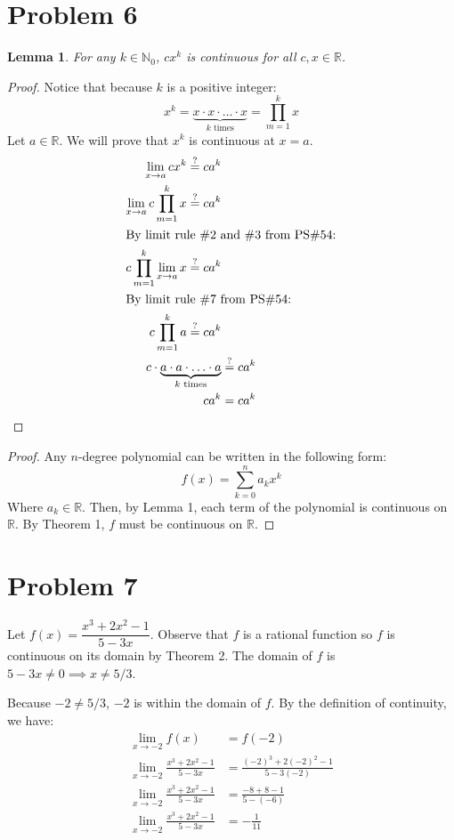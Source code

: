 \documentclass{article}
\newtheorem{lemma}{Lemma}
\newcommand*{\problem}[1]{\section*{Problem #1}}
\newcommand*{\limit}[2][x]{\ensuremath{\displaystyle\lim_{#1\to#2}}}
\begin{document}
\problem{6}
\begin{lemma}
	For any $k\in\mathbb{N}_0$, $cx^k$ is continuous for all $c,x\in\mathbb{R}$.
\end{lemma}
\begin{proof}
	Notice that because $k$ is a positive integer:
	\begin{equation*}
		x^k=\underbrace{x\cdot x\cdot\ldots\cdot x}_{k\text{ times}}=\prod_{m=1}^{k}x
	\end{equation*}
	Let $a\in\mathbb{R}$. We will prove that $x^k$ is continuous at $x=a$.
	\begin{align*}
		\limit{a}cx^k\overset{?}{=}ca^k \\
		\limit{a}c\prod_{m=1}^{k}x\overset{?}{=}ca^k \\
		\intertext{By limit rule \#2 and \#3 from PS\#54:}
		c\prod_{m=1}^{k}\limit{a}x\overset{?}{=}ca^k \\
		\intertext{By limit rule \#7 from PS\#54:}
		c\prod_{m=1}^{k}a\overset{?}{=}ca^k \\
		c\cdot\underbrace{a\cdot a\cdot\ldots\cdot a}_{k\text{ times}}&\overset{?}{=}ca^k \\
		ca^k&=ca^k
	\end{align*}
\end{proof}

\begin{proof}
	Any $n$-degree polynomial can be written in the following form:
	\begin{equation*}
		f(x)=\sum_{k=0}^{n}a_kx^k
	\end{equation*}
	Where $a_k\in\mathbb{R}$. Then, by Lemma 1, each term of the polynomial is continuous on $\mathbb{R}$. By Theorem 1, $f$ must be continuous on $\mathbb{R}$.
\end{proof}

\problem{7}
Let $f(x)=\dfrac{x^3+2x^2-1}{5-3x}$. Observe that $f$ is a rational function so $f$ is continuous on its domain by Theorem 2. The domain of $f$ is $5-3x\neq0\implies x\neq5/3$.

Because $-2\neq5/3$, $-2$ is within the domain of $f$. By the definition of continuity, we have:
\begin{align*}
	\limit{-2}f(x)&=f(-2) \\
	\limit{-2}\frac{x^3+2x^2-1}{5-3x}&=\frac{(-2)^3+2(-2)^2-1}{5-3(-2)} \\
	\limit{-2}\frac{x^3+2x^2-1}{5-3x}&=\frac{-8+8-1}{5-(-6)} \\
	\limit{-2}\frac{x^3+2x^2-1}{5-3x}&=\boxed{-\frac{1}{11}}
\end{align*}
\end{document}
